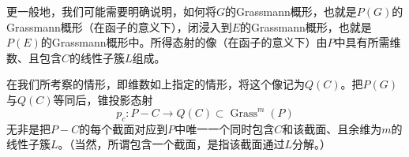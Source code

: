 \documentclass[openany,fontset=fandol]{ctexbook}
\begin{document}
更一般地，我们可能需要明确说明，如何将$G$的Grassmann概形，也就是$P(G)$的Grassmann概形（在函子的意义下），闭浸入到$E$的Grassmann概形，也就是$P(E)$的Grassmann概形中。所得态射的像（在函子的意义下）由$P$中具有所需维数、且包含$C$的线性子簇$L$组成。

在我们所考察的情形，即维数如上指定的情形，将这个像记为$Q(C)$。把$P(G)$与$Q(C)$等同后，锥投影态射
\[
p_c:P-C\longrightarrow Q(C)\subset\operatorname{Grass}^{m}(P)
\]
无非是把$P-C$的每个截面对应到$P$中唯一一个同时包含$C$和该截面、且余维为$m$的线性子簇$L$。（当然，所谓包含一个截面，是指该截面通过$L$分解。）
\end{document}
